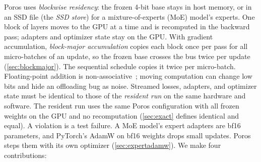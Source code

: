 \documentclass[11pt,letterpaper]{article}
\theoremstyle{definition}
\theoremstyle{plain}
\begin{document}
Poros uses \emph{blockwise residency}: the frozen 4-bit base stays in host memory, or in an SSD file (the \emph{SSD store}) for a mixture-of-experts (MoE) model's experts.
One block of layers moves to the GPU at a time and is recomputed in the backward pass; adapters and optimizer state stay on the GPU.
With gradient accumulation, \emph{block-major accumulation} copies each block once per pass for all micro-batches of an update, so the frozen base crosses the bus twice per update (\cref{sec:blockmajor}).
The sequential schedule copies it twice per micro-batch.
Floating-point addition is non-associative~\cite{goldberg1991floating}; moving computation can change low bits and hide an offloading bug as noise.
Streamed losses, adapters, and optimizer state must be identical to those of the \emph{resident run} on the same hardware and software.
The resident run uses the same Poros configuration with all frozen weights on the GPU and no recomputation (\cref{sec:exact} defines identical and equal).
A violation is a test failure.
A MoE model's expert adapters are bf16 parameters, and PyTorch's AdamW on bf16 weights drops small updates.
Poros steps them with its own optimizer (\cref{sec:expertadamw}).
We make four contributions:
\end{document}
